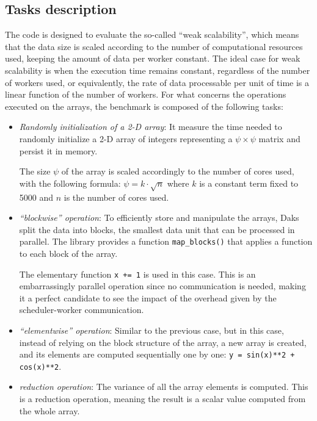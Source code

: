 \subsection{Tasks description}\label{subsec:benchmarktasks}

The code is designed to evaluate the so-called ``weak scalability'', which means
that the data size is scaled according to the number of computational resources
used, keeping the amount of data per worker constant.
The ideal case for weak scalability is when the execution time remains constant,
regardless of the number of workers used, or equivalently, the rate of data
processable per unit of time is a linear function of the number of workers.
For what concerns the operations executed on the arrays, the benchmark is
composed of the following tasks:

\begin{itemize}
  \itemsep0em
  \item \textit{Randomly initialization of a 2-D array}: It measure the time
    needed to randomly initialize a 2-D array of integers representing a
    $\psi\times\psi$ matrix and persist it in memory.

    The size $\psi$ of the array is scaled accordingly to the number of cores
    used, with the following formula: $\psi = k \cdot \sqrt{n}$ where $k$ is a
    constant term fixed to 5000 and $n$ is the number of cores used.
  \item \textit{``blockwise'' operation}: To efficiently store and manipulate
    the arrays, Daks split the data into blocks, the smallest data unit that
    can be processed in parallel.
    The library provides a function \texttt{map\_blocks()} that applies a
    function to each block of the array.

    The elementary function \texttt{x += 1} is used in this case.
    This is an embarrassingly parallel operation since no communication is
    needed, making it a perfect candidate to see the impact of the overhead
    given by the scheduler-worker communication.
  \item \textit{``elementwise'' operation}: Similar to the previous case, but in
    this case, instead of relying on the block structure of the array, a new
    array is created, and its elements are computed sequentially one by one:
    \texttt{y = sin(x)**2 + cos(x)**2}.
  \item \textit{reduction operation}: The variance of all the array elements is
    computed.
    This is a reduction operation, meaning the result is a scalar value computed
    from the whole array.


\end{itemize}
